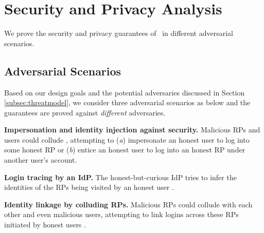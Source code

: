 \section{Security and Privacy Analysis}
\label{sec:analysis}

We prove the security and privacy guarantees of \usso\ in different adversarial scenarios.


\subsection{Adversarial Scenarios}

Based on our design goals %
 and the potential adversaries discussed in Section \ref{subsec:threatmodel}, we consider three adversarial scenarios as below
 and the guarantees are proved against \emph{different} adversaries.


\noindent\textbf{Impersonation and identity injection against security.}
 Malicious RPs and users could collude \cite{FettKS14,BrowserID,SPRESSO},
  attempting to (\emph{a}) impersonate an honest user to log into some honest RP
   or (\emph{b}) entice an honest user to log into an honest RP under another user's account.

\noindent\textbf{Login tracing by an IdP.}
The honest-but-curious IdP tries to infer the identities of the RPs being visited by an honest user \cite{BrowserID, SPRESSO}.

\noindent\textbf{Identity linkage by colluding RPs.}
Malicious RPs could collude with each other and even malicious users, attempting to link logins across these RPs initiated by honest users \cite{maler2008venn, FirefoxAccount}. 



